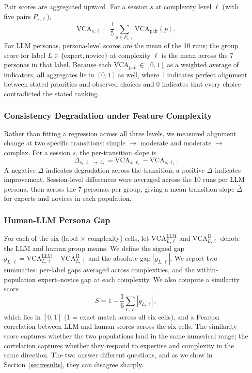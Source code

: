 \documentclass{sigchi-ext}
\begin{document}
Pair scores are aggregated upward. For a session $s$ at complexity level $\ell$ (with five pairs $P_{s,\ell}$),
\begin{equation}
\mathrm{VCA}_{s,\ell} = \frac{1}{5}\sum_{p \in P_{s,\ell}} \mathrm{VCA}_{\text{pair}}(p).
\end{equation}
For LLM personas, persona-level scores are the mean of the 10 runs; the group score for label $L \in \{\text{expert}, \text{novice}\}$ at complexity $\ell$ is the mean across the 7 personas in that label. Because each $\mathrm{VCA}_{\text{pair}} \in [0,1]$ as a weighted average of indicators, all aggregates lie in $[0,1]$ as well, where 1 indicates perfect alignment between stated priorities and observed choices and 0 indicates that every choice contradicted the stated ranking.

\subsubsection{Consistency Degradation under Feature Complexity}
Rather than fitting a regression across all three levels, we measured alignment change at two specific transitions: simple $\rightarrow$ moderate and moderate $\rightarrow$ complex. For a session $s$, the per-transition slope is
\begin{equation}
\Delta_{s,\,\ell_1 \rightarrow \ell_2} = \mathrm{VCA}_{s,\ell_2} - \mathrm{VCA}_{s,\ell_1}.
\end{equation}
A negative $\Delta$ indicates degradation across the transition; a positive $\Delta$ indicates improvement. Session-level differences were averaged across the 10 runs per LLM persona, then across the 7 personas per group, giving a mean transition slope $\bar{\Delta}$ for experts and novices in each population.

\subsubsection{Human-LLM Persona Gap}
For each of the six (label $\times$ complexity) cells, let $\mathrm{VCA}^{\text{LLM}}_{L,\ell}$ and $\mathrm{VCA}^{\text{H}}_{L,\ell}$ denote the LLM and human group means. We define the signed gap $g_{L,\ell} = \mathrm{VCA}^{\text{LLM}}_{L,\ell} - \mathrm{VCA}^{\text{H}}_{L,\ell}$ and the absolute gap $|g_{L,\ell}|$. We report two summaries: per-label gaps averaged across complexities, and the within-population expert--novice gap at each complexity. We also compute a similarity score
\begin{equation}
S = 1 - \frac{1}{6}\sum_{L,\ell} |g_{L,\ell}|,
\end{equation}
which lies in $[0,1]$ (1 = exact match across all six cells), and a Pearson correlation between LLM and human scores across the six cells. The similarity score captures whether the two populations land in the same numerical range; the correlation captures whether they respond to expertise and complexity in the same direction. The two answer different questions, and as we show in Section~\ref{sec:results}, they can disagree sharply.
\end{document}
